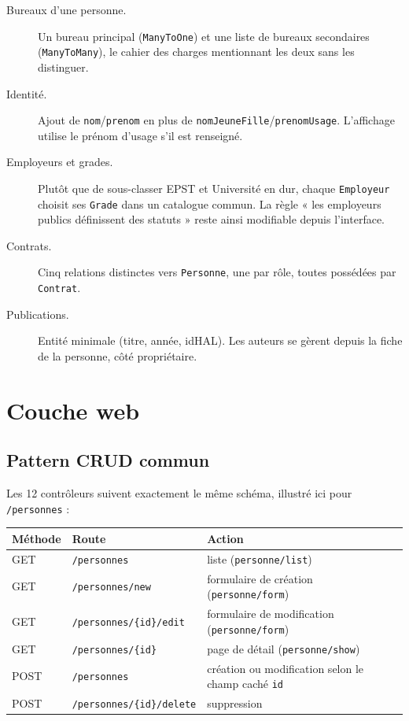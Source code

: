 \documentclass[a4paper,11pt]{article}
\newcommand{\code}[1]{\texttt{#1}}
\begin{document}
\begin{description}
  \item[Bureaux d'une personne.] Un bureau principal (\code{ManyToOne}) et une
    liste de bureaux secondaires (\code{ManyToMany}), le cahier des charges
    mentionnant les deux sans les distinguer.
  \item[Identité.] Ajout de \code{nom}/\code{prenom} en plus de
    \code{nomJeuneFille}/\code{prenomUsage}. L'affichage utilise le prénom
    d'usage s'il est renseigné.
  \item[Employeurs et grades.] Plutôt que de sous-classer EPST et Université en
    dur, chaque \code{Employeur} choisit ses \code{Grade} dans un catalogue
    commun. La règle « les employeurs publics définissent des statuts » reste
    ainsi modifiable depuis l'interface.
  \item[Contrats.] Cinq relations distinctes vers \code{Personne}, une par rôle,
    toutes possédées par \code{Contrat}.
  \item[Publications.] Entité minimale (titre, année, idHAL). Les auteurs se
    gèrent depuis la fiche de la personne, côté propriétaire.
\end{description}

\section{Couche web}

\subsection{Pattern CRUD commun}

Les 12 contrôleurs suivent exactement le même schéma, illustré ici pour
\code{/personnes} :

\begin{center}
\begin{tabular}{@{}lll@{}}
\toprule
\textbf{Méthode} & \textbf{Route} & \textbf{Action} \\
\midrule
GET  & \code{/personnes} & liste (\code{personne/list}) \\
GET  & \code{/personnes/new} & formulaire de création (\code{personne/form}) \\
GET  & \code{/personnes/\{id\}/edit} & formulaire de modification (\code{personne/form}) \\
GET  & \code{/personnes/\{id\}} & page de détail (\code{personne/show}) \\
POST & \code{/personnes} & création ou modification selon le champ caché \code{id} \\
POST & \code{/personnes/\{id\}/delete} & suppression \\
\bottomrule
\end{tabular}
\end{center}
\end{document}

